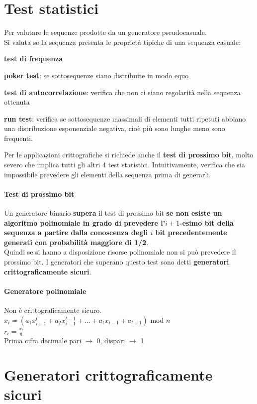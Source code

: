 \documentclass[10pt]{book}
\begin{document}
\section{Test statistici}
Per valutare le sequenze prodotte da un generatore pseudocasuale.\\
Si valuta se la sequenza presenta le proprietà tipiche di una sequenza casuale:
\begin{list}{}{}
	\item \textbf{test di frequenza}
	\item \textbf{poker test}: se sottosequenze siano distribuite in modo equo
	\item \textbf{test di autocorrelazione}: verifica che non ci siano regolarità nella sequenza ottenuta
	\item \textbf{run test}: verifica se sottosequenze massimali di elementi tutti ripetuti abbiano una distribuzione esponenziale negativa, cioè più sono lunghe meno sono frequenti.
\end{list}
Per le applicazioni crittografiche si richiede anche il \textbf{test di prossimo bit}, molto severo che implica tutti gli altri 4 test statistici. Intuitivamente, verifica che sia impossibile prevedere gli elementi della sequenza prima di generarli.
\paragraph{Test di prossimo bit} Un generatore binario \textbf{supera} il test di prossimo bit \textbf{se non esiste un algoritmo polinomiale in grado di prevedere l'$i+1$-esimo bit della sequenza a partire dalla conoscenza degli $i$ bit precedentemente generati con probabilità maggiore di 1/2}.\\
Quindi se si hanno a disposizione risorse polinomiale non si può prevedere il prossimo bit. I generatori che superano questo test sono detti \textbf{generatori crittograficamente sicuri}.
\paragraph{Generatore polinomiale} Non è crittograficamente sicuro.\\
$x_i = (a_1 x_{i-1}^t + a_2 x_{i-1}^{t-1} + \ldots + a_t x_{i-1} + a_{t+1})$ mod $n$\\
$r_i = \frac{x_i}{n}$\\
Prima cifra decimale pari $\rightarrow$ 0, dispari $\rightarrow$ 1
\section{Generatori crittograficamente sicuri}
\end{document}
